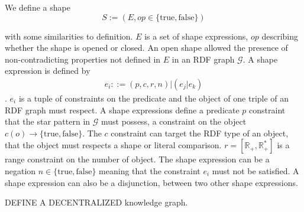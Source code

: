 We define a shape
\begin{equation}
S := (E, op \in \{\mathrm{true},\mathrm{false}\})
\end{equation}

with some similarities to \citeauthor{Abbas2018} definition.
$E$ is a set of shape expressions, $op$ describing whether the shape is opened or closed.
An open shape allowed the presence of non-contradicting properties not defined in $E$ in an RDF graph $\mathcal{G}$.
A shape expression is defined by
\begin{align}
 e_i ::= (p, c, r, n) | (e_j|e_k)
\end{align}
.
$e_i$ is a tuple of constraints on the predicate and the object of one triple of an RDF graph must respect. 
A shape expressions define a predicate $p$ constraint that the star pattern in $\mathcal{G}$ must possess,
a constraint on the object $c(o) \rightarrow \{\mathrm{true}, \mathrm{false}\}$.
The $c$ constraint can target the RDF type of an object, that the object must respects a shape or literal comparison.
$r = [\mathbb{R}_+, \mathbb{R}_{+}^{*}]$ is a range constraint on the number of object.
The shape expression can be a negation $n \in \{\mathrm{true}, \mathrm{false}\}$ meaning that the constraint $e_i$ must not be satisfied.
A shape expression can also be a disjunction, between two other shape expressions.


DEFINE A DECENTRALIZED knowledge graph.